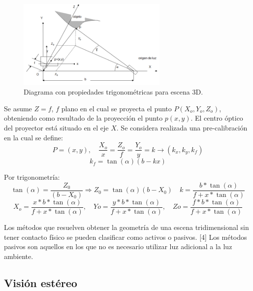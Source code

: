 \begin{figure}[H]
  \centering
    \includegraphics[width=0.65\textwidth]{./Cap6_reconstruccion/triangulacion-2.PNG}
  \caption{Diagrama con propiedades trigonométricas para escena 3D.}
  \label{fig:Triangulacion2}
\end{figure}

Se asume $Z = f$, $f$ plano en el cual se proyecta el punto $P(X_o,Y_o,Z_o)$, obteniendo como resultado de la proyección el punto $p(x,y)$.
El centro óptico del proyector está situado en el eje $X$.
Se considera realizada una pre-calibración en la cual se define:
\[
P = (x,y), \quad \frac{X_o}{x} = \frac{Z_o}{f} = \frac{Y_o}{y} = k \to (k_x,k_y,k_f)
\]
\[
k_f = \tan (\alpha)(b - kx)
\]

Por trigonometría:
\[
\tan (\alpha) = \frac{Z_0}{(b - X_0)} \Rightarrow Z_0 = \tan (\alpha) (b - X_0) \quad k = \frac	{b * \tan (\alpha)}{f + x * \tan (\alpha)}
\]
\[
X_o = \frac{x * b * \tan (\alpha)}{f + x * \tan (\alpha)}, \quad Yo = \frac{y * b * \tan (\alpha)}{f + x * \tan (\alpha)},\quad Zo = \frac{f * b * \tan (\alpha)}{f + x * \tan (\alpha)}
\]

Los métodos que resuelven obtener la geometría de una escena tridimensional sin tener contacto físico se pueden clasificar como activos o pasivos. [4]
Los métodos pasivos son aquellos en los que no es necesario utilizar luz adicional a la luz ambiente.

\subsection{Visión estéreo}

